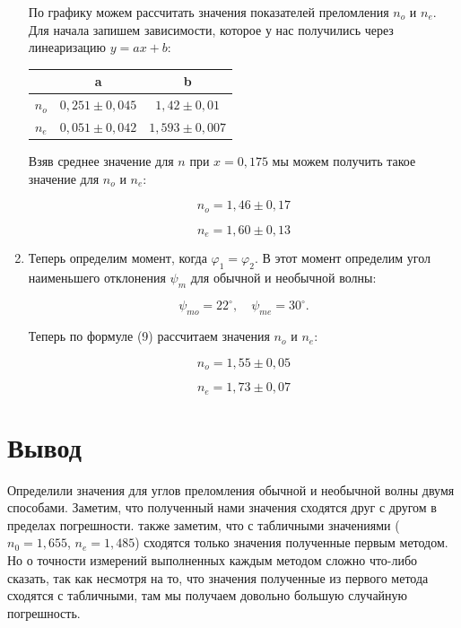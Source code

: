 \documentclass[a4paper, 12pt]{article}%
\begin{document}
\begin{enumerate}
По графику можем рассчитать значения показателей преломления $n_o$ и $n_e$. Для начала запишем зависимости, которое у нас получились через линеаризацию $y = ax + b$:

\begin{center}
\begin{tabular}{|c|c|c|}
\hline 
 & a & b \\ 
\hline 
$n_o$ & $0,251\pm 0,045$ & $1,42\pm 0,01$ \\ 
\hline 
$n_e$ & $0,051 \pm 0,042$ & $1,593 \pm 0,007$ \\ 
\hline 
\end{tabular} 
\end{center}

Взяв среднее значение для $n$ при $x = 0,175$ мы можем получить такое значение для $n_o$ и $n_e$:

\[n_o = 1,46 \pm 0,17\]

\[n_e = 1,60 \pm 0,13\]

\item Теперь определим момент, когда $\varphi_1 = \varphi_2$. В этот момент определим угол наименьшего отклонения $\psi_m$ для обычной и необычной волны:

\[\psi_{mo} = 22^{\circ}, \quad \psi_{me} = 30^{\circ}.\]

Теперь по формуле (9) рассчитаем значения $n_o$ и $n_e$:

\[n_o = 1,55 \pm 0,05\]

\[n_e = 1,73 \pm 0,07\]

\end{enumerate}

\section*{Вывод}

Определили значения для углов преломления обычной и необычной волны двумя способами. Заметим, что полученный нами значения сходятся друг с другом в пределах погрешности. также заметим, что с табличными значениями ($n_0 = 1,655$, $n_e = 1,485$) сходятся только значения полученные первым методом. Но о точности измерений выполненных каждым методом сложно что-либо сказать, так как несмотря на то, что значения полученные из первого метода сходятся с табличными, там мы получаем довольно большую случайную погрешность.
\end{document}
